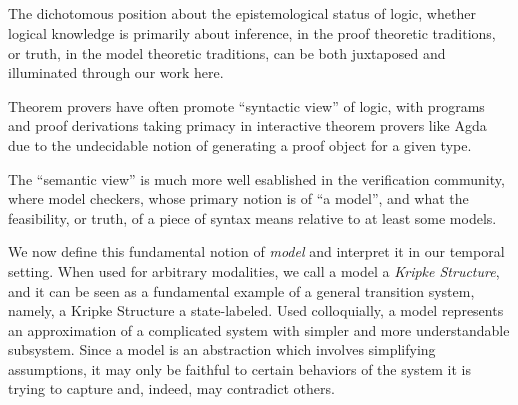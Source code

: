 \documentclass[a4paper, 11pt]{article}
\begin{document}
\begin{code}%
\>[0]\AgdaSpace{}%
\AgdaSymbol{:}\AgdaSpace{}%
\AgdaSpace{}%
\AgdaSpace{}%
\<%
\\
\>[0]\AgdaSpace{}%
\AgdaSpace{}%
\AgdaSymbol{=}\AgdaSpace{}%
\AgdaSpace{}%
\AgdaSpace{}%
\AgdaSpace{}%
\AgdaSpace{}%
\<%
\\
%
\\[\AgdaEmptyExtraSkip]%
\>[0]\AgdaSpace{}%
\AgdaSymbol{:}\AgdaSpace{}%
\AgdaSymbol{\{}\AgdaSpace{}%
\AgdaSymbol{:}\AgdaSpace{}%
\AgdaSymbol{\}}\AgdaSpace{}%
\AgdaSpace{}%
\AgdaSpace{}%
\AgdaSpace{}%
\AgdaSpace{}%
\<%
\\
\>[0]\AgdaSpace{}%
\AgdaSymbol{\{}\AgdaSymbol{\}}\AgdaSpace{}%
\AgdaSpace{}%
\AgdaSymbol{=}\AgdaSpace{}%
\AgdaSpace{}%
\AgdaSymbol{(}\AgdaSpace{}%
\AgdaSymbol{:}\AgdaSpace{}%
\AgdaSymbol{)}\AgdaSpace{}%
\AgdaSpace{}%
\AgdaFunction{Σ[}\AgdaSpace{}%
\AgdaSpace{}%
\AgdaSpace{}%
\AgdaSpace{}%
\AgdaFunction{]}\AgdaSpace{}%
\AgdaSymbol{(}\AgdaSpace{}%
\AgdaSpace{}%
\AgdaSymbol{)}\<%
\end{code}

The dichotomous position about the epistemological status of logic, whether
logical knowledge is primarily about inference, in the proof theoretic
traditions, or truth, in the model theoretic traditions, can be both juxtaposed
and illuminated through our work here.

Theorem provers have often promote ``syntactic view'' of logic, with programs
and proof derivations taking primacy in interactive theorem provers like Agda
due to the undecidable notion of generating a proof object for a given type.

The ``semantic view'' is much more well esablished in the verification
community, where model checkers, whose primary notion is of ``a model'', and
what the feasibility, or truth, of a piece of syntax means relative to at least
some models.

We now define this fundamental notion of \emph{model} and
interpret it in our temporal setting. When used for arbitrary modalities, we
call a model a \emph{Kripke Structure}, and it can be seen as a fundamental
example of a general transition system, namely, a Kripke Structure a state-labeled. Used
colloquially, a model represents an approximation of a complicated system with
simpler and more understandable subsystem. Since a model is an abstraction which
involves simplifying assumptions, it may only be faithful to certain behaviors
of the system it is trying to capture and, indeed, may contradict others.
\end{document}
